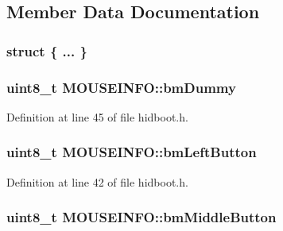 \subsection{\-Member \-Data \-Documentation}
\hypertarget{struct_m_o_u_s_e_i_n_f_o_a7781eb8148a8a10019b1e69df1c4a3e5}{\subsubsection[{"@9}]{\setlength{\rightskip}{0pt plus 5cm}struct \{ ... \} }}\label{struct_m_o_u_s_e_i_n_f_o_a7781eb8148a8a10019b1e69df1c4a3e5}
\hypertarget{struct_m_o_u_s_e_i_n_f_o_a5ebb72d23926ca7891c2c4606be31ac3}{
\subsubsection[{bm\-Dummy}]{\setlength{\rightskip}{0pt plus 5cm}uint8\-\_\-t {\bf \-M\-O\-U\-S\-E\-I\-N\-F\-O\-::bm\-Dummy}}}\label{struct_m_o_u_s_e_i_n_f_o_a5ebb72d23926ca7891c2c4606be31ac3}


\-Definition at line 45 of file hidboot.\-h.

\hypertarget{struct_m_o_u_s_e_i_n_f_o_a848ceb3b38f0dc9e09a83612c1fa89ff}{
\subsubsection[{bm\-Left\-Button}]{\setlength{\rightskip}{0pt plus 5cm}uint8\-\_\-t {\bf \-M\-O\-U\-S\-E\-I\-N\-F\-O\-::bm\-Left\-Button}}}\label{struct_m_o_u_s_e_i_n_f_o_a848ceb3b38f0dc9e09a83612c1fa89ff}


\-Definition at line 42 of file hidboot.\-h.

\hypertarget{struct_m_o_u_s_e_i_n_f_o_a7fb48a7cb68cfc8db2bb8838694c0b51}{
\subsubsection[{bm\-Middle\-Button}]{\setlength{\rightskip}{0pt plus 5cm}uint8\-\_\-t {\bf \-M\-O\-U\-S\-E\-I\-N\-F\-O\-::bm\-Middle\-Button}}}\label{struct_m_o_u_s_e_i_n_f_o_a7fb48a7cb68cfc8db2bb8838694c0b51}


